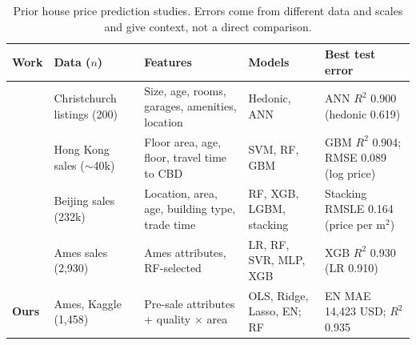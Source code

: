 \begin{table}[t]
\centering
\scriptsize
\begin{tabular}{@{}>{\raggedright\arraybackslash}p{2.5cm} >{\raggedright\arraybackslash}p{2.3cm} >{\raggedright\arraybackslash}p{3.4cm} >{\raggedright\arraybackslash}p{2.5cm} >{\raggedright\arraybackslash}p{3.6cm}@{}}
\toprule
\textbf{Work} & \textbf{Data ($n$)} & \textbf{Features} & \textbf{Models} & \textbf{Best test error} \\
\midrule
\citet{limsombunchai2004house} & Christchurch listings (200) & Size, age, rooms, garages, amenities, location & Hedonic, ANN & ANN $R^2$ 0.900 (hedonic 0.619) \\
\citet{ho2021predicting} & Hong Kong sales ($\sim$40k) & Floor area, age, floor, travel time to CBD & SVM, RF, GBM & GBM $R^2$ 0.904; RMSE 0.089 (log price) \\
\citet{truong2020housing} & Beijing sales (232k) & Location, area, age, building type, trade time & RF, XGB, LGBM, stacking & Stacking RMSLE 0.164 (price per m$^2$) \\
\citet{sharma2024optimal} & Ames sales (2,930) & Ames attributes, RF-selected & LR, RF, SVR, MLP, XGB & XGB $R^2$ 0.930 (LR 0.910) \\
\midrule
\textbf{Ours} & Ames, Kaggle (1,458) & Pre-sale attributes + quality $\times$ area & OLS, Ridge, Lasso, EN; RF & EN MAE 14,423 USD; $R^2$ 0.935 \\
\bottomrule
\end{tabular}
\caption{Prior house price prediction studies. Errors come from different data and scales and give context, not a direct comparison.}
\label{tab:related}
\end{table}
